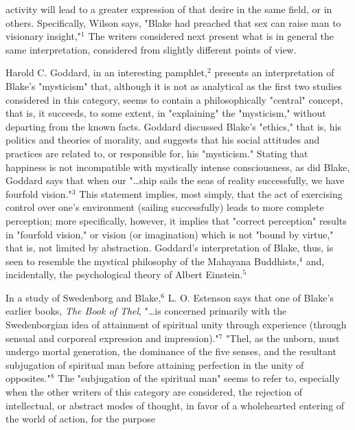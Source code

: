 \noindent activity will lead to a greater expression of that desire in the same field, or
in others. Specifically, Wilson says, "Blake had preached that sex can raise man to visionary insight,"$^{1}$ The writers
considered next present what is in general the same interpretation, considered
from slightly different points of view.\par
\vspace*{0.5\baselineskip}
Harold C. Goddard, in an interesting pamphlet,$^{2}$ presents an interpretation of
Blake's "mysticism" that, although it is not as analytical as the first two studies considered
in this category, seems to contain a philosophically "central" concept,
that is, it succeeds, to some extent, in "explaining" the "mysticism," without departing from
the known facts. Goddard discussed Blake's "ethics," that is, his politics
and theories of morality, and suggests that his social attitudes and practices
are related to, or responsible for, his "mysticism." Stating that happiness is not incompatible
with mystically intense consciousness, as did Blake, Goddard says that when our "\dots ship
sails the seas of reality successfully, we have fourfold vision."$^{3}$ This statement implies,
most simply, that the act of exercising control over one's environment (sailing successfully) leads
to more complete perception; more specifically, however, it implies that
"correct perception" results in "fourfold vision," or vision (or imagination)
which is not "bound by virtue," that is, not limited by abstraction. Goddard's
interpretation of Blake, thus, is seen to resemble the mystical philosophy of
the Mahayana Buddhists,$^{4}$ and, incidentally, the psychological theory of
Albert Einstein.$^{5}$\par
\vspace*{0.5\baselineskip}
In a study of Swedenborg and Blake,$^{6}$ L. O. Estenson says that one of Blake's earlier books,
\textit{The Book of Thel}, "\dots is concerned primarily with the Swedenborgian idea of attainment of 
spiritual unity through experience (through sensual and corporeal expression and impression)."$^{7}$ "Thel,
as the unborn, must undergo mortal generation, the dominance of the five senses, and the resultant
subjugation of spiritual man before attaining perfection in the unity of opposites."$^{8}$
The "subjugation of the spiritual man" seems to refer to, especially when the other
writers of this category are considered, the rejection of intellectual, or abstract modes of 
thought, in favor of a wholehearted entering of the world of action, for the purpose 
